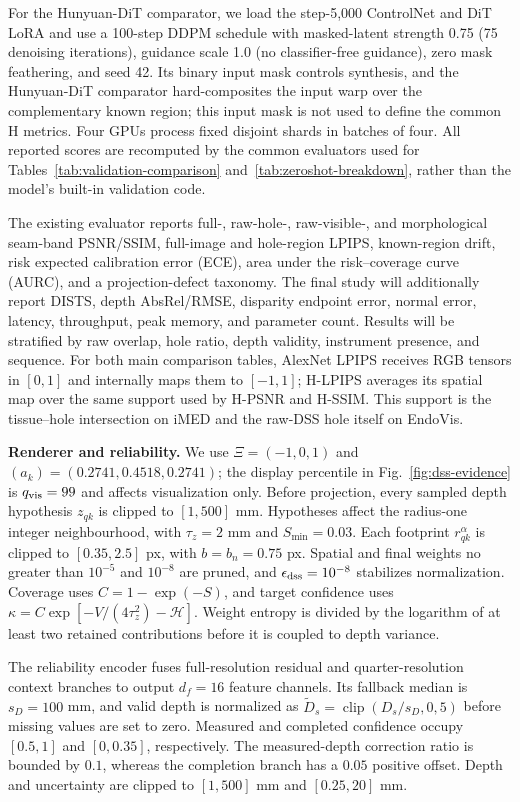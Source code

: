 \documentclass[letterpaper,10pt,conference]{ieeeconf}
\begin{document}
For the Hunyuan-DiT comparator, we load the step-5,000 ControlNet and DiT LoRA
and use a 100-step DDPM schedule with masked-latent strength 0.75 (75 denoising
iterations), guidance scale 1.0 (no classifier-free guidance), zero mask
feathering, and seed 42. Its binary input mask controls synthesis, and the
Hunyuan-DiT comparator hard-composites the input warp over the complementary
known region; this input mask is not used to define the common H metrics. Four
GPUs process fixed disjoint shards in batches of four. All reported scores are
recomputed by the common evaluators used for
Tables~\ref{tab:validation-comparison} and~\ref{tab:zeroshot-breakdown}, rather
than the model's built-in validation code.

The existing evaluator reports full-, raw-hole-, raw-visible-, and morphological
seam-band PSNR/SSIM, full-image and hole-region LPIPS, known-region drift, risk
expected calibration error (ECE), area under the risk--coverage curve (AURC),
and a projection-defect taxonomy. The final study will additionally report DISTS, depth AbsRel/RMSE,
disparity endpoint error, normal error, latency, throughput, peak memory, and
parameter count. Results will be stratified by raw overlap, hole ratio, depth
validity, instrument presence, and sequence.
For both main comparison tables, AlexNet LPIPS receives RGB tensors in $[0,1]$
and internally maps them to $[-1,1]$; H-LPIPS averages its spatial map over the
same support used by H-PSNR and H-SSIM. This support is the tissue--hole
intersection on iMED and the raw-DSS hole itself on EndoVis.

\noindent\textbf{Renderer and reliability.}
We use $\Xi=(-1,0,1)$ and $(a_k)=(0.2741,0.4518,0.2741)$; the display
percentile in Fig.~\ref{fig:dss-evidence} is $q_{\rm vis}=99$ and affects
visualization only. Before projection, every sampled depth
hypothesis $z_{qk}$ is clipped to $[1,500]$ mm. Hypotheses affect the radius-one
integer neighbourhood, with $\tau_z=2$ mm and $S_{\min}=0.03$. Each footprint
$r^\alpha_{qk}$ is clipped to $[0.35,2.5]$ px, with $b=b_n=0.75$ px. Spatial
and final weights no greater than $10^{-5}$ and $10^{-8}$ are pruned, and
$\epsilon_{\rm dss}=10^{-8}$ stabilizes normalization.
Coverage uses $C=1-\exp(-S)$, and target confidence uses
$\kappa=C\exp[-V/(4\tau_z^2)-\mathcal H]$. Weight entropy is divided by the
logarithm of at least two retained contributions before it is coupled to depth
variance.

The reliability encoder fuses full-resolution residual and quarter-resolution
context branches to output $d_f=16$ feature channels. Its fallback median is
$s_D=100$ mm, and valid depth is normalized as
$\widetilde D_s=\operatorname{clip}(D_s/s_D,0,5)$ before missing values are set
to zero. Measured and completed confidence occupy $[0.5,1]$ and $[0,0.35]$,
respectively. The measured-depth correction ratio is bounded by $0.1$, whereas
the completion branch has a $0.05$ positive offset. Depth and uncertainty are
clipped to $[1,500]$ mm and $[0.25,20]$ mm.
\end{document}

